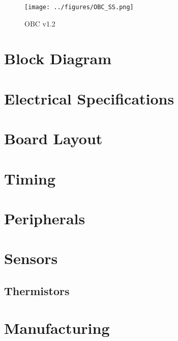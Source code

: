 \documentclass[10pt]{../datasheet}
\begin{document}
\begin{figure}[H]
  \centering
  \texttt{[image: ../figures/OBC\_SS.png]}
  \caption{\centering OBC v1.2}
  \label{fig:enter-label}
\end{figure}

\onecolumn
\section{Block Diagram}

\section{Electrical Specifications}
\section{Board Layout}
\section{Timing}
\section{Peripherals}
\section{Sensors}
\subsection{Thermistors}
\section{Manufacturing}
\end{document}
